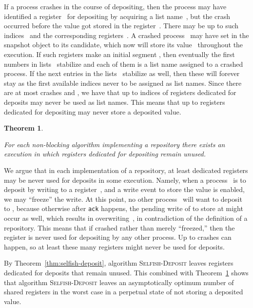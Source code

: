 \documentclass[11pt]{article}
\newcommand{\qed}{\hfill  \smallbreak}
\newenvironment{proof}{\noindent{\bf Proof:}}{\qed}
\newtheorem{theorem}{Theorem}
\begin{document}
\begin{proof}
If a process crashes in the course of depositing, then the process may have identified  a register~ for depositing by acquiring a list name~, but the crash occurred before the value got stored in the register~.
There may be up to  such indices~ and the corresponding registers~.
A crashed process~ may have set  in the snapshot object to its candidate, which now will store its value~ throughout the execution.
If such registers  make an initial segment , then eventually the first  numbers in lists~ stabilize and each of them is a list name assigned to a crashed process. 
If the next  entries in the lists~ stabilize as well, then these will forever stay as the first  available indices never to be assigned as list names.
Since there are at most  crashes and ,  we have that up to  indices of registers dedicated for deposits may never be used as list names.
This means that up to  registers dedicated for depositing may never store a deposited value.
\end{proof} 





\begin{theorem}
\label{thm:non-blocking-repository}

For each non-blocking algorithm implementing a repository there exists an execution in which  registers dedicated for depositing remain unused. 
\end{theorem}

\begin{proof}
We argue that in each implementation of a repository, at least  dedicated registers may be never used for deposits in some execution.
Namely, when a process~ is to deposit by writing to a register~, and a write event to store the value is enabled, we may ``freeze'' the write.
At this point, no  other process~ will want to deposit to , because otherwise after \texttt{ack} happens, the pending write of  to store at  might occur as well, which results in overwriting~, in contradiction of the definition of a repository.
This means that if  crashed rather than merely ``freezed,'' then the register  is never used for depositing by any other process. 
Up to  crashes can happen, so at least these many registers might never be used for deposits.
\end{proof}

By Theorem~\ref{thm:selfish-deposit}, algorithm \textsc{Selfish-Deposit} leaves   registers dedicated for deposits that remain unused.
This combined with Theorem~\ref{thm:non-blocking-repository} shows that algorithm \textsc{Selfish-Deposit} leaves an asymptotically optimum number of shared registers in the worst case in a perpetual state of not storing a deposited value.
\end{document}
